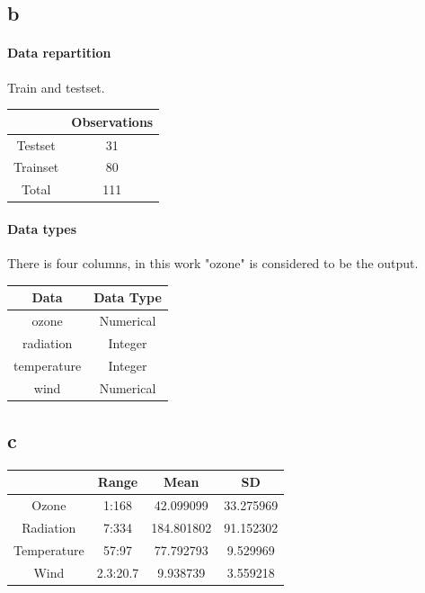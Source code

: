 \documentclass[11pt,a4paper,twoside,openright]{report}
\begin{document}
	\subsection*{b}
	
	\paragraph{Data repartition} Train and testset.\\
	
	
	\begin{table}[H]
		\centering
		\begin{tabular}{|c|c|}
			\hline 
			& \textbf{Observations} \\ 
			\hline 
			Testset & 31 \\ 
			\hline 
			Trainset & 80 \\ 
			\hline 
			Total & 111 \\ 
			\hline 
		\end{tabular} 
	\end{table}


\paragraph{Data types}  There is four columns, in this work "ozone" is considered to be the output.\\

	\begin{table}[H]
		\centering
		\begin{tabular}{|c|c|}
			\hline 
			\textbf{Data} & \textbf{Data Type}\\ 
			\hline 
			ozone & Numerical \\ 
			\hline 
			radiation & Integer \\ 
			\hline 
			temperature & Integer \\ 
			\hline 
			wind & Numerical \\ 
			\hline 
		\end{tabular} 
	\end{table}
	
	
	\subsection*{c}
	
	 
	\begin{table}[H]
		\centering
		\begin{tabular}{|c|c|c|c|}
			\hline 
			& Range & Mean & SD \\ 
			\hline 
			Ozone & 1:168 & 42.099099 & 33.275969 \\ 
			\hline 
			Radiation & 7:334 & 184.801802 & 91.152302 \\ 
			\hline 
			Temperature & 57:97 & 77.792793 & 9.529969 \\ 
			\hline 
			Wind & 2.3:20.7 & 9.938739 & 3.559218 \\ 
			\hline 
		\end{tabular} 
	\end{table}
	
\end{document}
